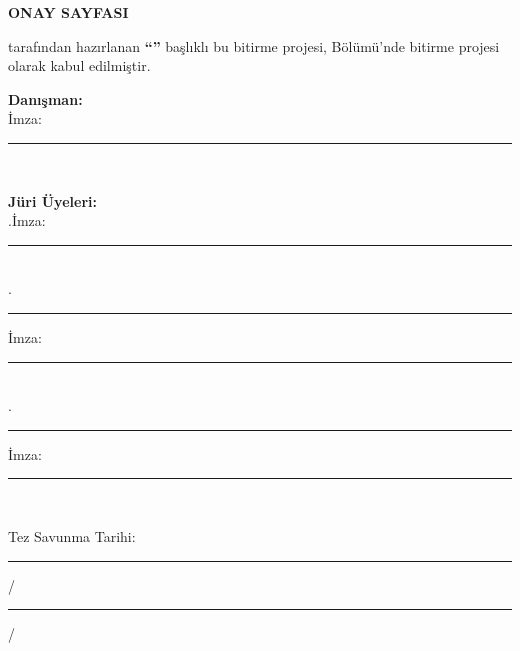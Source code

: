\clearpage
\thispagestyle{empty}

\begin{center}
{\Large \textbf{ONAY SAYFASI}}
\end{center}

\vspace{1cm}

\authorname{} tarafından hazırlanan \textbf{\enquote{\ttitle}} başlıklı bu bitirme projesi, \university{} \faculty{} \dept{} Bölümü'nde bitirme projesi olarak kabul edilmiştir.

\vspace{2cm}

\noindent\textbf{Danışman:}\\[0.3cm]
\supname \hfill İmza: \rule{4cm}{0.4pt}\\[0.2cm]
\university

\vspace{2cm}

\noindent\textbf{Jüri Üyeleri:}\\[0.5cm]

.\quad \supname \hfill İmza: \rule{4cm}{0.4pt}\\[0.8cm]
.\quad \rule{6cm}{0.4pt} \hfill İmza: \rule{4cm}{0.4pt}\\[0.8cm]
.\quad \rule{6cm}{0.4pt} \hfill İmza: \rule{4cm}{0.4pt}\\[1.5cm]

\begin{center}
Tez Savunma Tarihi: \rule{3cm}{0.4pt} / \rule{2cm}{0.4pt} / \degreeyear
\end{center}
